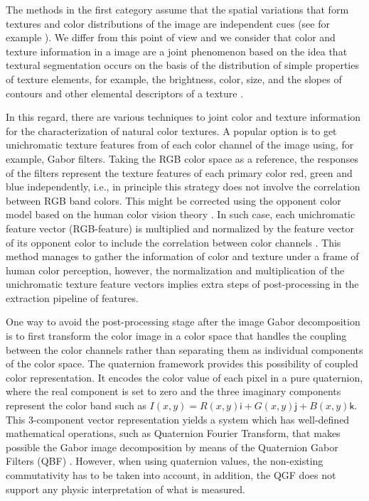 The methods in the first category assume that the spatial variations that form textures and color distributions of the image are independent cues (see for example \citep{Permuter.Francos.ea:PR:2006}). We differ from this point of view and we consider that color and texture information in a image are a joint phenomenon based on the idea that textural segmentation occurs on the basis of the distribution of simple properties of texture elements, for example, the brightness, color, size, and the slopes of contours and other elemental descriptors of a texture \citep{Werner.Chalupa:Book:2004}.
 
In this regard, there are various techniques to joint color and texture information for the characterization of natural color textures. A popular option is to get unichromatic texture features from
of each color channel of the image using, for example, Gabor filters. Taking the RGB color space as a reference, the responses of the filters represent the texture features of each primary color red, green and blue independently, i.e., in principle this strategy does not involve the correlation between RGB band colors. This might be corrected using the opponent color model based on the human color vision theory \citep{Jain.Healey:TIP:1998}. In such case, 
each unichromatic feature vector (RGB-feature) is multiplied and normalized by the feature vector of its opponent color to include the correlation between color channels \citep{Palm.Keysers.ea:JCIS:2000}. This method manages to gather the information of color and texture under a frame of human color perception, however, the normalization and multiplication of the unichromatic texture feature vectors implies extra steps of post-processing in the extraction pipeline of features. 

One way to avoid the post-processing stage after the image Gabor decomposition is to first transform the color image in a color space that handles the coupling between the color channels rather than separating them as individual components of the color space. The quaternion framework \citep{Sangwine.Ell:VISP:2000} provides this possibility of coupled color representation. It encodes the color value of each pixel in a pure quaternion, where the real component is set to zero and the three imaginary components represent the color band such as $I(x, y) = R (x, y) \mathsf{i} + G (x, y) \mathsf{j} + B (x, y) \mathsf{k}$. This 3-component vector representation yields a system which has well-defined mathematical operations, such as Quaternion Fourier Transform, that makes possible the Gabor image decomposition by means of the Quaternion Gabor Filters (QBF) \citep{Subakan.Vemuri:EMMCVPR:2009}. However, when using quaternion values, the non-existing commutativity has to be taken into account, in addition, the QGF does not support any physic interpretation of what is measured. 

